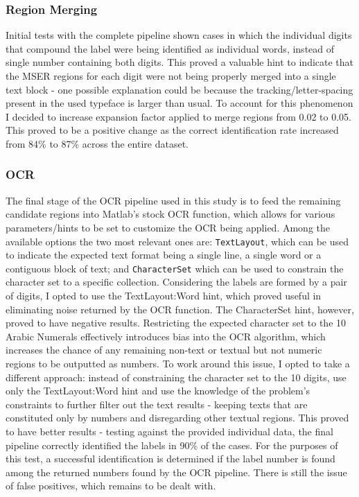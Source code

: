 \documentclass[11pt]{article}
\begin{document}
    \subsubsection{Region Merging}
        Initial tests with the complete pipeline shown cases in which the individual digits that compound the label were being identified as individual words, instead of single number containing both digits. This proved a valuable hint to indicate that the MSER regions for each digit were not being properly merged into a single text block - one possible explanation could be because the tracking/letter-spacing present in the used typeface is larger than usual. To account for this phenomenon I decided to increase expansion factor applied to merge regions from 0.02 to 0.05. This proved to be a positive change as the correct identification rate increased from 84\% to 87\% across the entire dataset.

    \subsubsection{OCR}
        The final stage of the OCR pipeline used in this study is to feed the remaining candidate regions into Matlab's stock OCR function, which allows for various parameters/hints to be set to customize the OCR being applied. Among the available options the two most relevant ones are: \texttt{TextLayout}, which can be used to indicate the expected text format being a single line, a single word or a contiguous block of text; and \texttt{CharacterSet} which can be used to constrain the character set to a specific collection. Considering the labels are formed by a pair of digits, I opted to use the TextLayout:Word hint, which proved useful in eliminating noise returned by the OCR function. The CharacterSet hint, however, proved to have negative results. Restricting the expected character set to the 10 Arabic Numerals effectively introduces bias into the OCR algorithm, which increases the chance of any remaining non-text or textual but not numeric regions to be outputted as numbers. To work around this issue, I opted to take a different approach: instead of constraining the character set to the 10 digits, use only the TextLayout:Word hint and use the knowledge of the problem's constraints to further filter out the text results - keeping texts that are constituted only by numbers and disregarding other textual regions. This proved to have better results - testing against the provided individual data, the final pipeline correctly identified the labels in 90\% of the cases. For the purposes of this test, a successful identification is determined if the label number is found among the returned numbers found by the OCR pipeline. There is still the issue of false positives, which remains to be dealt with.
\end{document}

